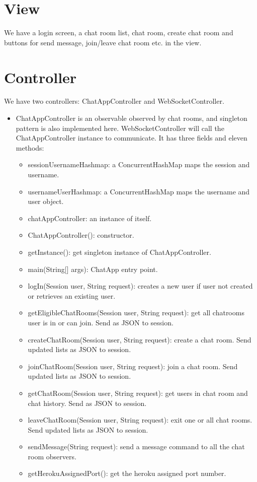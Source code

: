 \documentclass[letterpaper, 11pt]{article}
\begin{document}
\section{View}
We have a login screen, a chat room list, chat room, create chat room and buttons for send message, join/leave chat room etc. in the view.

\section{Controller}
We have two controllers: ChatAppController and WebSocketController. 
\begin{itemize}
\item ChatAppController is an observable observed by chat rooms, and singleton pattern is also implemented here. WebSocketController will call the ChatAppController instance to communicate. It has three fields and eleven methods:
\begin{itemize}
\item sessionUsernameHashmap: a ConcurrentHashMap maps the session and username.
\item usernameUserHashmap: a ConcurrentHashMap maps the username and user object.
\item chatAppController: an instance of itself.
\item ChatAppController(): constructor.
\item getInstance(): get singleton instance of ChatAppController.
\item main(String[] args): ChatApp entry point.
\item logIn(Session user, String request): creates a new user if user not created or retrieves an existing user.
\item getEligibleChatRooms(Session user, String request): get all chatrooms user is in or can join. Send as JSON to session.
\item createChatRoom(Session user, String request): create a chat room. Send updated lists as JSON to session.
\item joinChatRoom(Session user, String request): join a chat room. Send updated lists as JSON to session.
\item getChatRoom(Session user, String request): get users in chat room and chat history. Send as JSON to session.
\item leaveChatRoom(Session user, String request): exit one or all chat rooms. Send updated lists as JSON to session.
\item sendMessage(String request): send a message command to all the chat room observers.
\item getHerokuAssignedPort(): get the heroku assigned port number.
\end{itemize}


\end{itemize}
\end{document}
